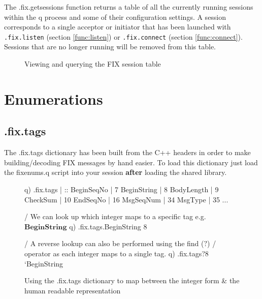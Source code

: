 The .fix.getsessions function returns a table of all the currently running sessions within the q process and some of their configuration settings. A session corresponds
to a single acceptor or initiator that has been launched with \texttt{.fix.listen} (section \ref{func:listen}) or \texttt{.fix.connect} (section \ref{func:connect}). Sessions that are no longer
running will be removed from this table.

\begin{figure}[H]
\caption{Viewing and querying the FIX session table}
\end{figure}

\section{Enumerations}
\subsection{.fix.tags}
The .fix.tags dictionary has been built from the C++ headers in order to make building/decoding FIX messages by hand easier. To load this dictionary just load
the fixenums.q script into your session \textbf{after} loading the shared library.\\

\begin{figure}[H]
\begin{qcode}
q) .fix.tags
               | ::
BeginSeqNo     | 7
BeginString    | 8
BodyLength     | 9
CheckSum       | 10
EndSeqNo       | 16
MsgSeqNum      | 34
MsgType        | 35
...

/ We can look up which integer maps to a specific tag e.g. $\textbf{BeginString}$
q) .fix.tags.BeginString
8

/ A reverse lookup can also be performed using the find ($\textbf{?}$) 
/ operator as each integer maps to a single tag.
q) .fix.tags?8
`BeginString
\end{qcode}
\caption{Using the .fix.tags dictionary to map between the integer form \& the human readable representation}
\label{fig:tags}
\end{figure}

